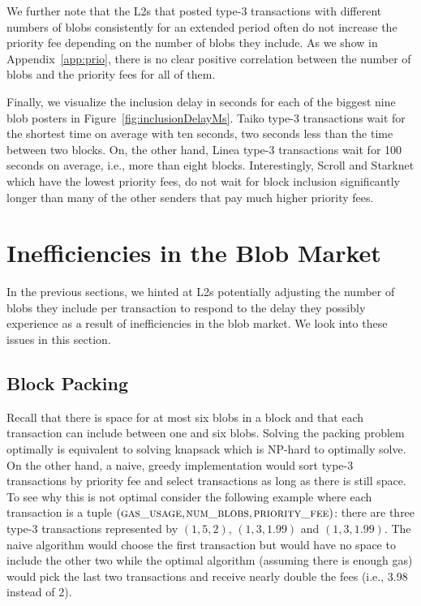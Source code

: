 We further note that the L2s that posted type-3 transactions with different numbers of blobs consistently for an extended period often do not increase the priority fee depending on the number of blobs they include. As we show in Appendix~\ref{app:prio}, there is no clear positive correlation between the number of blobs and the priority fees for all of them. 

Finally, we visualize the inclusion delay in seconds for each of the biggest nine blob posters in Figure~\ref{fig:inclusionDelayMs}. Taiko type-3 transactions wait for the shortest time on average with ten seconds, two seconds less than the time between two blocks. On, the other hand, Linea type-3 transactions wait for 100 seconds on average, i.e., more than eight blocks. Interestingly, Scroll and Starknet which have the lowest priority fees, do not wait for block inclusion significantly longer than many of the other senders that pay much higher priority fees.


\section{Inefficiencies in the Blob Market}\label{sec:issues}
In the previous sections, we hinted at L2s potentially adjusting the number of blobs they include per transaction to respond to the delay they possibly experience as a result of inefficiencies in the blob market. We look into these issues in this section.

\subsection{Block Packing}
Recall that there is space for at most six blobs in a block and that each transaction can include between one and six blobs. Solving the packing problem optimally is equivalent to solving knapsack which is NP-hard to optimally solve. On the other hand, a naive, greedy implementation would sort type-3 transactions by priority fee and select transactions as long as there is still space. To see why this is not optimal consider the following example where each transaction is a tuple $(\textsc{gas\_usage},$$\textsc{num\_blobs},$$ \textsc{priority\_fee})$: there are three type-3 transactions represented by $(1,5,2)$, $(1,3,1.99)$ and $(1,3,1.99)$. The naive algorithm would choose the first transaction but would have no space to include the other two while the optimal algorithm (assuming there is enough gas) would pick the last two transactions and receive nearly double the fees (i.e., 3.98 instead of 2).


